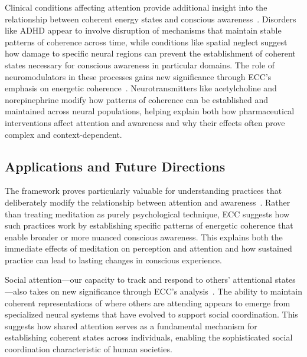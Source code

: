 Clinical conditions affecting attention provide additional insight into the relationship between coherent energy states and conscious awareness~\cite{bosl2025dynamical}. Disorders like ADHD appear to involve disruption of mechanisms that maintain stable patterns of coherence across time, while conditions like spatial neglect suggest how damage to specific neural regions can prevent the establishment of coherent states necessary for conscious awareness in particular domains. The role of neuromodulators in these processes gains new significance through ECC's emphasis on energetic coherence~\cite{pinotsis2023vivo}. Neurotransmitters like acetylcholine and norepinephrine modify how patterns of coherence can be established and maintained across neural populations, helping explain both how pharmaceutical interventions affect attention and awareness and why their effects often prove complex and context-dependent.

\subsection*{Applications and Future Directions}

The framework proves particularly valuable for understanding practices that deliberately modify the relationship between attention and awareness~\cite{da2024mathematical}. Rather than treating meditation as purely psychological technique, ECC suggests how such practices work by establishing specific patterns of energetic coherence that enable broader or more nuanced conscious awareness. This explains both the immediate effects of meditation on perception and attention and how sustained practice can lead to lasting changes in conscious experience.

Social attention—our capacity to track and respond to others' attentional states—also takes on new significance through ECC's analysis~\cite{butlin2023consciousnessartificialintelligenceinsights}. The ability to maintain coherent representations of where others are attending appears to emerge from specialized neural systems that have evolved to support social coordination. This suggests how shared attention serves as a fundamental mechanism for establishing coherent states across individuals, enabling the sophisticated social coordination characteristic of human societies.

